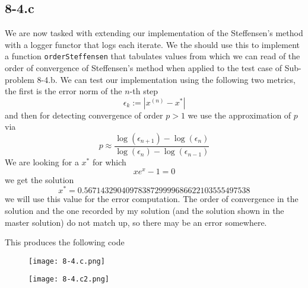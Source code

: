 \documentclass{article}
\newcommand\xn{x^{\left(n\right)}}
\newcommand\xstar{x^{*}}
\begin{document}
\subsection*{8-4.c}
We are now tasked with extending our implementation of the Steffensen's method with a logger functor that logs each iterate. We the should use this to implement a function \verb|orderSteffensen| that tabulates values from which we can read of the order of convergence of Steffensen's method when applied to the test case of Sub-problem 8-4.b. We can test our implementation using the following two metrics, the first is the error norm of the $n$-th step
\begin{equation*}
    \epsilon_{k} := \left\lvert \xn - \xstar\right\rvert
\end{equation*}
and then for detecting convergence of order $p > 1$ we use the approximation of $p$ via
\begin{equation*}
    p \approx \frac{\log\left(\epsilon_{n+1}\right) - \log\left(\epsilon_{n}\right)}{\log\left(\epsilon_{n}\right) - \log\left(\epsilon_{n-1}\right)}
\end{equation*}
We are looking for a $\xstar$ for which
\begin{equation*}
    xe^{x} - 1 = 0
\end{equation*}
we get the solution
\begin{equation*}
    \xstar = 0.5671432904097838729999686622103555497538
\end{equation*}
we will use this value for the error computation. The order of convergence in the solution and the one recorded by my solution (and the solution shown in the master solution) do not match up, so there may be an error somewhere. 

\pagebreak

\noindent This produces the following code

\begin{figure}[!hbt]
    \centering
\texttt{[image: 8-4.c.png]}
\end{figure}

\begin{figure}[!hbt]
    \centering
\texttt{[image: 8-4.c2.png]}
\end{figure}

\pagebreak
\end{document}
